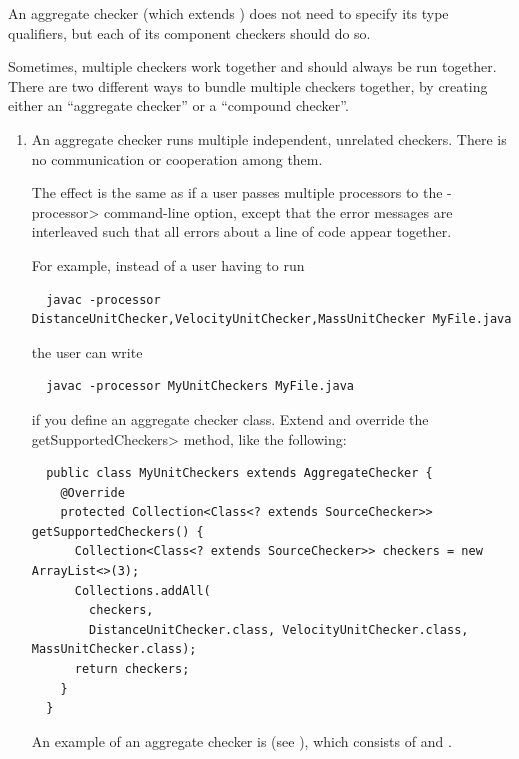 An aggregate checker (which extends
) does not need to specify its
type qualifiers, but each of its component checkers should do so.



Sometimes, multiple checkers work together and should always be run
together.  There are two different ways to bundle multiple checkers
together, by creating either an ``aggregate checker'' or a ``compound checker''.


\begin{enumerate}
\item
An aggregate checker runs multiple independent, unrelated checkers.  There
is no communication or cooperation among them.

The effect is the same as if a user passes
multiple processors to the \<-processor> command-line option,
except that the error messages are interleaved
such that all errors about a line of code appear together.

For example, instead of a user having to run

\begin{Verbatim}
  javac -processor DistanceUnitChecker,VelocityUnitChecker,MassUnitChecker MyFile.java
\end{Verbatim}

\noindent
the user can write

\begin{Verbatim}
  javac -processor MyUnitCheckers MyFile.java
\end{Verbatim}

\noindent
if you define an aggregate checker class.  Extend  and override
the \<getSupportedCheckers> method, like the following:

\begin{Verbatim}
  public class MyUnitCheckers extends AggregateChecker {
    @Override
    protected Collection<Class<? extends SourceChecker>> getSupportedCheckers() {
      Collection<Class<? extends SourceChecker>> checkers = new ArrayList<>(3);
      Collections.addAll(
        checkers,
        DistanceUnitChecker.class, VelocityUnitChecker.class, MassUnitChecker.class);
      return checkers;
    }
  }
\end{Verbatim}

An example of an aggregate checker is 
(see ), which consists of
 and
.


\end{enumerate}
